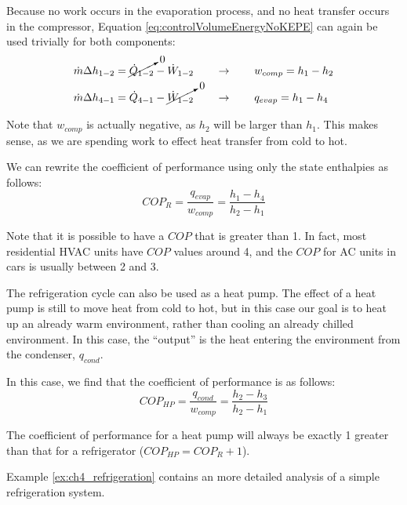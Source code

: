 Because no work occurs in the evaporation process, and no heat transfer occurs in the compressor, Equation \ref{eq:controlVolumeEnergyNoKEPE} can again be used trivially for both components:
\begin{align*}
  \dot{m} \Delta h_{1-2} &= \cancelto{0}{\dot{Q}_{1-2}} - \dot{W}_{1-2}  \quad\quad\rightarrow\quad\quad w_{comp} = h_1 - h_2 \\
  \dot{m} \Delta h_{4-1} &= \dot{Q}_{4-1} - \cancelto{0}{\dot{W}_{1-2}}  \quad\quad\rightarrow\quad\quad q_{evap} = h_1 - h_4
\end{align*}

Note that $w_{comp}$ is actually negative, as $h_2$ will be larger than $h_1$.  This makes sense, as we are spending work to effect heat transfer from cold to hot.

We can rewrite the coefficient of performance using only the state enthalpies as follows:
\begin{equation} \label{eq:ch4_COPRSimplified}
  COP_{R} = \frac{q_{evap}}{w_{comp}} = \frac{h_1-h_4}{h_2 - h_1}
\end{equation}

Note that it is possible to have a $COP$ that is greater than 1.  In fact, most residential HVAC units have $COP$ values around 4, and the $COP$ for AC units in cars is usually between 2 and 3.

The refrigeration cycle can also be used as a heat pump.  The effect of a heat pump is still to move heat from cold to hot, but in this case our goal is to heat up an already warm environment, rather than cooling an already chilled environment.  In this case, the ``output'' is the heat entering the environment from the condenser, $q_{cond}$.

In this case, we find that the coefficient of performance is as follows:
\begin{equation} \label{eq:ch4_COPHPSimplified}
  COP_{HP} = \frac{q_{cond}}{w_{comp}} = \frac{h_2-h_3}{h_2 - h_1}
\end{equation}

The coefficient of performance for a heat pump will always be exactly 1 greater than that for a refrigerator ($COP_{HP} = COP_R + 1$).

Example \ref{ex:ch4_refrigeration} contains an more detailed analysis of a simple refrigeration system.

